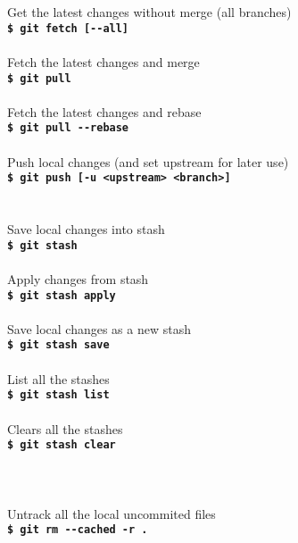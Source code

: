 \documentclass[12pt,a3paper,margin=4pt,landscape]{article}
\newcommand{\cmd}[2]{
	#1\\
	\texttt{\textbf{\$ git #2}}\\
	\\
}
\newcommand{\cmdnoline}[2]{
	#1\\
	\texttt{\textbf{\$ git #2}}
}
\newcommand{\sect}[2]{
	\section*{\color{#1}{#2}}
}
\begin{document}
\begin{multicols}{4}


\sect{Orange}{Synchronize}

\cmd{Get the latest changes without merge (all branches)}{fetch [-{}-all]}
\cmd{Fetch the latest changes and merge}{pull}
\cmd{Fetch the latest changes and rebase}{pull -{}-rebase}
\cmdnoline{Push local changes (and set upstream for later use)}{push [-u <upstream> <branch>]}

\begin{adjustwidth}{0.5\columnwidth}{0pt}
\sect{BrickRed}{Stash}
\cmd{Save local changes into stash}{stash}
\cmd{Apply changes from stash}{stash apply}
\cmd{Save local changes as a new stash}{stash save}
\cmd{List all the stashes}{stash list}
\cmd{Clears all the stashes}{stash clear}

\sect{Blue}{Repair}
\cmd{Untrack all the local uncommited files}{rm -{}-cached -r .}
\end{adjustwidth}


\end{multicols}
\end{document}
